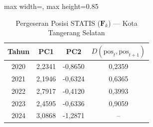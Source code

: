 \begin{table}[H]
\centering
\caption{Pergeseran Posisi STATIS ($\mathbf{F}_k$) --- Kota Tangerang Selatan} \label{tab:app1jarak_statis_skor_kota_tangerang_selatan}
\begin{adjustbox}{max width=\textwidth, max height=0.85\textheight}
\begin{tabular}{|c|c|c|c|}
\hline
\textbf{Tahun} & \textbf{PC1} & \textbf{PC2} & \textbf{$D(\text{pos}_t, \text{pos}_{t+1})$} \\
\hline
2020 & 2,2341 & -0,8650 & 0,2359 \\
2021 & 2,1946 & -0,6324 & 0,6365 \\
2022 & 2,7917 & -0,4120 & 0,3993 \\
2023 & 2,4595 & -0,6336 & 0,9059 \\
2024 & 3,0868 & -1,2871 & -- \\
\hline
\end{tabular}
\end{adjustbox}
\end{table}